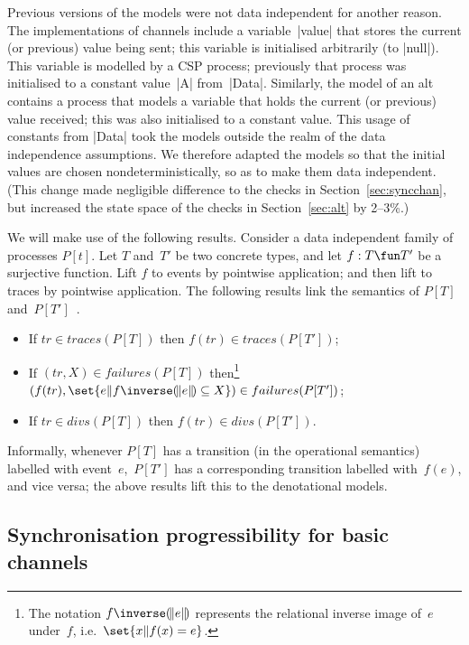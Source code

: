 Previous versions of the models were not data independent for another reason.
The implementations of channels include a variable~|value| that stores the
current (or previous) value being sent; this variable is initialised
arbitrarily (to |null|).  This variable is modelled by a CSP process;
previously that process was initialised to a constant value~|A| from~|Data|.
Similarly, the model of an alt contains a process that models a variable that
holds the current (or previous) value received; this was also initialised to a
constant value.  This usage of constants from |Data| took the models outside
the realm of the data independence assumptions.  We therefore adapted the
models so that the initial values are chosen nondeterministically, so as to
make them data independent.  (This change made negligible difference to the
checks in Section~\ref{sec:syncchan}, but increased the state space of the
checks in Section~\ref{sec:alt} by 2--3\%.)

We will make use of the following results.
Consider a data independent family of processes $P[t]$.  Let $T$ and~$T'$ be
two concrete types, and let $f: T \fun T'$ be a surjective function.  Lift $f$
to events by pointwise application; and then lift to traces by pointwise
application.  The following results link the semantics of $P[T]$
and~$P[T']$~\cite{gavin:di}. 
%
\begin{itemize}
\item If $tr \in traces(P[T])$ then $f(tr) \in traces(P[T'])$;

\item If $(tr,X) \in failures(P[T])$ then\footnote{The notation
  $f\inverse\banana{e}$ represents the relational inverse image of~$e$
  under~$f$, i.e.~$\set{x \| f(x) = e}$.}
$(f(tr), \set{e \|  f\inverse\banana{e} \subseteq X}) \in failures(P[T'])$;


\item If $tr \in divs(P[T])$ then $f(tr) \in divs(P[T'])$. 
\end{itemize}
%
Informally, whenever $P[T]$ has a transition (in the operational semantics)
labelled with event~$e$,\, $P[T']$ has a corresponding transition labelled
with~$f(e)$, and vice versa; the above results lift this to the denotational
models.


\subsection{Synchronisation progressibility for basic channels}

